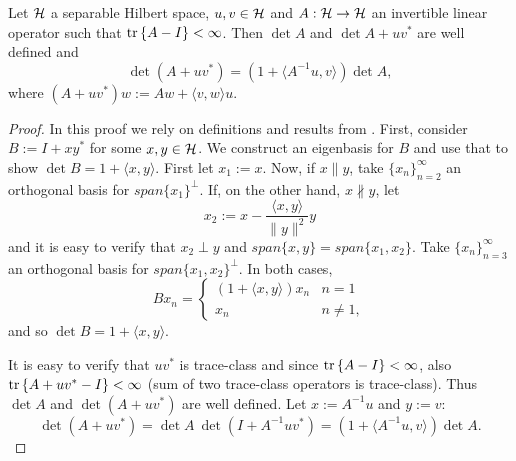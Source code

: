 \documentclass{amsart}
\numberwithin{equation}{section}
\providecommand{\DIFaddbegin}{} %
\providecommand{\DIFdelend}{} %
\begin{document}
\DIFdelend \DIFaddbegin \begin{lemma}\label{lemma:MDL}
  Let $\mathcal{H}$ a separable Hilbert space, $u,v\in \mathcal{H}$ and $A: \mathcal{H} \to
  \mathcal{H}$ an invertible linear operator such that $\textup{tr}\left \{A-I \right \} <
  \infty$. Then $\det A$ and $\det A + uv^*$ are well defined and
  \begin{equation*}
    \det (A + uv^*) = (1 + \langle A^{-1} u, v \rangle ) \det A,
  \end{equation*}
  where $(A + uv^*)w := Aw + \langle v,w \rangle u$.
\end{lemma}
\begin{proof}
  In this proof we rely on definitions and results from
  \cite{Simon77}. First, consider $B := I + xy^*$ for some $x,y \in
  \mathcal{H}$. We construct an eigenbasis for $B$ and use that to show $\det
  B = 1 + \langle x, y \rangle$. First let $x_1 := x$.  Now, if $x
  \parallel y$, take $\{x_n \}_{n=2}^{\infty}$ an orthogonal basis for
  $span\{x_1\} ^{\perp}$. If, on the other hand, $x \nparallel y$, let
  \begin{equation*}
    x_2 := x - \frac{ \langle x, y\rangle}{\|y\|^2}y
  \end{equation*}
  and it is easy to verify that $x_2 \perp y$ and $span \{x,y\} = span
  \{x_1,x_2\}$. Take $\{x_n \}_{n=3}^{\infty}$ an orthogonal basis for
  $span\{x_1,x_2\} ^{\perp}$. In both cases,
  \begin{equation*}
    B x_n =
    \begin{cases}
      (1 + \langle x, y \rangle) x_n & n = 1 \\
      x_n                            & n \neq 1,
    \end{cases}
  \end{equation*}
  and so $\det B = 1 + \langle x, y \rangle$.

  It is easy to verify that $uv^*$ is trace-class and since $\textup{tr}\left \{A-I \right \}
  < \infty$, also $\textup{tr}\left \{A + uv^* - I \right \} < \infty$ (sum of two trace-class
  operators is trace-class). Thus $\det A$ and $\det (A+uv^*)$ are
  well defined. Let $x:=A^{-1}u$ and $y := v$:
  \begin{equation*}
    \det (A + uv^*) = \det A \ \det(I+A^{-1}uv^*) =
    (1 + \langle A^{-1}u, v \rangle) \det A .
  \end{equation*}
\end{proof}
\end{document}
